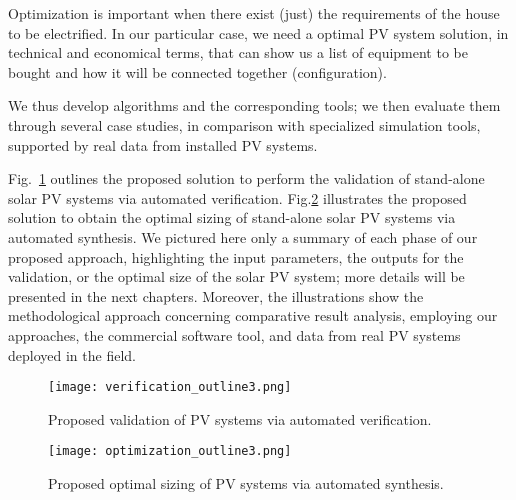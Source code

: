 Optimization is important when there exist (just) the requirements of the house to be electrified. In our particular case, we need a optimal PV system solution, in technical and economical terms, that can show us a list of equipment to be bought and how it will be connected together (configuration). 

We thus develop algorithms and the corresponding tools; we then evaluate them through several case studies, in comparison with specialized simulation tools, supported by real data from installed PV systems.

Fig.~\ref{fig:validation_outline} outlines the proposed solution to perform the validation of stand-alone solar PV systems via automated verification. Fig.\ref{fig:optimization_outline} illustrates the proposed solution to obtain the optimal sizing of stand-alone solar PV systems via automated synthesis. We pictured here only a summary of each phase of our proposed approach, highlighting the input parameters, the outputs for the validation, or the optimal size of the solar PV system; more details will be presented in the next chapters. Moreover, the illustrations show the methodological approach concerning comparative result analysis, employing our approaches, the commercial software tool, and data from real PV systems deployed in the field.

\begin{figure}[h]
\texttt{[image: verification\_outline3.png]}
\centering
\caption{Proposed validation of PV systems via automated verification.}
\label{fig:validation_outline} 
\end{figure}


\begin{figure}[h]
\texttt{[image: optimization\_outline3.png]}
\centering
\caption{Proposed optimal sizing of PV systems via automated synthesis.}
\label{fig:optimization_outline} 
\end{figure}

